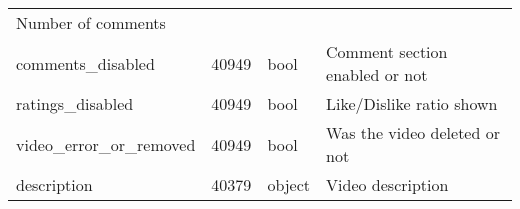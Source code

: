 \documentclass[11pt]{article}
\begin{document}
\begin{longtable}[]{@{}llll@{}}
\begin{minipage}[t]{0.25\columnwidth}
Number of comments\strut
\end{minipage}\tabularnewline
\begin{minipage}[t]{0.32\columnwidth}\raggedright
comments\_disabled\strut
\end{minipage} & \begin{minipage}[t]{0.18\columnwidth}\raggedright
40949\strut
\end{minipage} & \begin{minipage}[t]{0.14\columnwidth}\raggedright
bool\strut
\end{minipage} & \begin{minipage}[t]{0.25\columnwidth}\raggedright
Comment section enabled or not\strut
\end{minipage}\tabularnewline
\begin{minipage}[t]{0.32\columnwidth}\raggedright
ratings\_disabled\strut
\end{minipage} & \begin{minipage}[t]{0.18\columnwidth}\raggedright
40949\strut
\end{minipage} & \begin{minipage}[t]{0.14\columnwidth}\raggedright
bool\strut
\end{minipage} & \begin{minipage}[t]{0.25\columnwidth}\raggedright
Like/Dislike ratio shown\strut
\end{minipage}\tabularnewline
\begin{minipage}[t]{0.32\columnwidth}\raggedright
video\_error\_or\_removed\strut
\end{minipage} & \begin{minipage}[t]{0.18\columnwidth}\raggedright
40949\strut
\end{minipage} & \begin{minipage}[t]{0.14\columnwidth}\raggedright
bool\strut
\end{minipage} & \begin{minipage}[t]{0.25\columnwidth}\raggedright
Was the video deleted or not\strut
\end{minipage}\tabularnewline
\begin{minipage}[t]{0.32\columnwidth}\raggedright
description\strut
\end{minipage} & \begin{minipage}[t]{0.18\columnwidth}\raggedright
40379\strut
\end{minipage} & \begin{minipage}[t]{0.14\columnwidth}\raggedright
object\strut
\end{minipage} & \begin{minipage}[t]{0.25\columnwidth}\raggedright
Video description\strut
\end{minipage}\tabularnewline
\bottomrule
\end{longtable}
\end{document}
